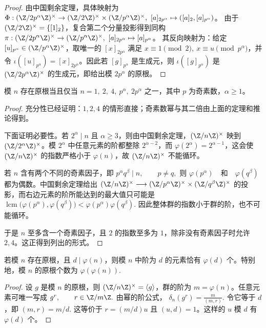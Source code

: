 \begin{proof}
由中国剩余定理，具体映射为
\(\Phi:\U{2p^\alpha}\to \U{2}\times\U{p^\alpha},\ [a]_{2p^\alpha}\mapsto ([a]_2,[a]_{p^\alpha})\)。
由于 \(\U{2}=\{[1]_2\}\)，复合第二个分量投影得到同构
\(\pi:\U{2p^\alpha}\to \U{p^\alpha},\ [a]_{2p^\alpha}\mapsto [a]_{p^\alpha}\)。
其反向映射为：给定 \([u]_{p^\alpha}\in\U{p^\alpha}\)，取唯一的 \([x]_{2p^\alpha}\) 满足
\(x\equiv 1\pmod 2,\ x\equiv u\pmod {p^\alpha}\)，并令
\(\iota([u]_{p^\alpha})=[x]_{2p^\alpha}\)。因此若 \([g]_{p^\alpha}\) 是生成元，则 \(\iota([g]_{p^\alpha})\) 是 \(\U{2p^\alpha}\) 的生成元，即给出模 \(2p^\alpha\) 的原根。
\end{proof}

\begin{theorem}[原根存在的完全判别]
模 $n$ 存在原根当且仅当
\(
  n=1,\ 2,\ 4,\ p^\alpha,\ 2p^\alpha
\)
之一，其中 $p$ 为奇素数，$\alpha\ge 1$。
\end{theorem}

\begin{proof}
充分性已经证明：$1,2,4$ 的情形直接；奇素数幂与其二倍由上面的定理和推论得到。

下面证明必要性。若 $2^\alpha\mid n$ 且 $\alpha\ge 3$，则由中国剩余定理，$\U n$ 映到 $\U{2^\alpha}$。模
$2^\alpha$ 中任意元素的阶都整除 $2^{\alpha-2}$，而 $\varphi(2^\alpha)=2^{\alpha-1}$，这会使 $\U n$ 的指数严格小于
$\varphi(n)$，故 $\U n$ 不能循环。

若 $n$ 含有两个不同的奇素因子，即
\(
  p^\alpha q^\beta\mid n,\qquad p\ne q,
\)
则
\(
  \varphi(p^\alpha)\quad\text{和}\quad \varphi(q^\beta)
\)
都为偶数。中国剩余定理给出
\(
  \U n
  \longrightarrow
  \U{p^\alpha}\times \U{q^\beta}
\)
的投影，而右边元素的阶所能达到的最大值只可能是
\(
  \operatorname{lcm}\bigl(\varphi(p^\alpha),\varphi(q^\beta)\bigr)
  <
  \varphi(p^\alpha)\varphi(q^\beta).
\)
因此整体群的指数小于群的阶，也不可能循环。

于是 $n$ 至多含一个奇素因子，且 $2$ 的指数至多为 $1$，除非没有奇素因子时允许 $2,4$。这正得到列出的形式。
\end{proof}

\begin{theorem}[循环情形中给定阶的元素个数]
若模 $n$ 存在原根，且 $d\mid \varphi(n)$，则模 $n$ 中阶为 $d$ 的元素恰有
\(
  \varphi(d)
\)
个。特别地，模 $n$ 的原根个数为
\(
  \varphi(\varphi(n)).
\)
\end{theorem}

\begin{proof}
设 $g$ 是模 $n$ 的原根，则 $\U n=\langle g\rangle$，群的阶为 $m=\varphi(n)$。任意元素可唯一写成
\(
  g^r,\qquad r\in \Z/m\Z.
\)
由幂的阶公式，
\(
  \delta_n(g^r)=\frac{m}{(m,r)}.
\)
令它等于 $d$，即
\(
  (m,r)=m/d.
\)
这等价于 $r=(m/d)u$ 且 $(u,d)=1$。这样的 $u$ 模 $d$ 有 $\varphi(d)$ 个。
\end{proof}

